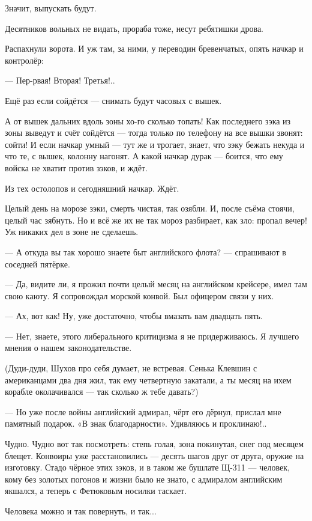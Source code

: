 Значит, выпускать будут.

Десятников вольных не видать, прораба тоже, несут ребятишки дрова.

Распахнули ворота. И уж там, за ними, у переводин бревенчатых, опять начкар и контролёр:

--- Пер-рвая! Вторая! Третья!..

Ещё раз если сойдётся --- снимать будут часовых с вышек.

А от вышек дальних вдоль зоны хо-го сколько топать! Как последнего зэка из зоны выведут и
счёт сойдётся --- тогда только по телефону на все вышки звонят: сойти! И если начкар умный ---
тут же и трогает, знает, что зэку бежать некуда и что те, с вышек, колонну нагонят. А какой
начкар дурак --- боится, что ему войска не хватит против зэков, и ждёт.

Из тех остолопов и сегодняшний начкар. Ждёт.

Целый день на морозе зэки, смерть чистая, так озябли. И, после съёма стоячи, целый час зябнуть.
Но и всё же их не так мороз разбирает, как зло: пропал вечер! Уж никаких дел в зоне не сделаешь.

--- А откуда вы так хорошо знаете быт английского флота? --- спрашивают в соседней пятёрке.

--- Да, видите ли, я прожил почти целый месяц на английском крейсере, имел там свою каюту. Я
сопровождал морской конвой. Был офицером связи у них.

--- Ах, вот как! Ну, уже достаточно, чтобы вмазать вам двадцать пять.

--- Нет, знаете, этого либерального критицизма я не придерживаюсь. Я лучшего мнения о нашем
законодательстве.

(Дуди-дуди, Шухов про себя думает, не встревая. Сенька Клевшин с американцами два дня жил, так
ему четвертную закатали, а ты месяц на ихем корабле околачивался --- так сколько ж тебе
давать?)

--- Но уже после войны английский адмирал, чёрт его дёрнул, прислал мне памятный подарок. «В
знак благодарности». Удивляюсь и проклинаю!..

Чудно. Чудно вот так посмотреть: степь голая, зона покинутая, снег под месяцем блещет.
Конвоиры уже расстановились --- десять шагов друг от друга, оружие на изготовку. Стадо чёрное
этих зэков, и в таком же бушлате Щ-311 --- человек, кому без золотых погонов и жизни было не
знато, с адмиралом английским якшался, а теперь с Фетюковым носилки таскает.

Человека можно и так повернуть, и так...

